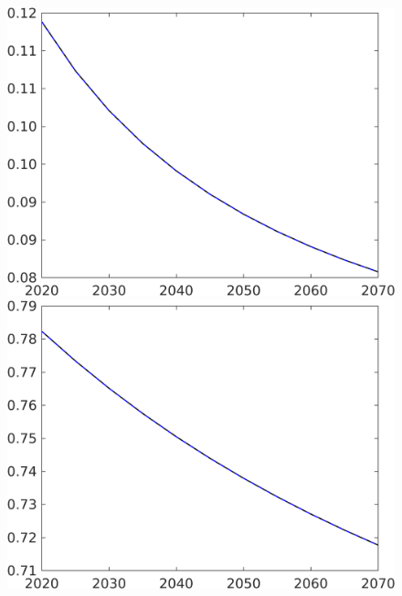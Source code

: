 \begin{figure}[h!!]
\begin{minipage}[]{0.32\textwidth}
	\end{minipage}
	\begin{minipage}[]{0.32\textwidth}
		\includegraphics[width=1\textwidth]{../../codding_model/own_basedOnFried/optimalPol_190722_tidiedUp/figures/all_10Aout22/CountTaul_modtest_target_sg_spillover0_sep1_extern0_PV1_etaa0.79_lgd0.png}
	\end{minipage}
	\begin{minipage}[]{0.32\textwidth}
	\includegraphics[width=1\textwidth]{../../codding_model/own_basedOnFried/optimalPol_190722_tidiedUp/figures/all_10Aout22/CountTaul_modtest_target_sn_spillover0_sep1_extern0_PV1_etaa0.79_lgd0.png}

\end{minipage}
\end{figure}
